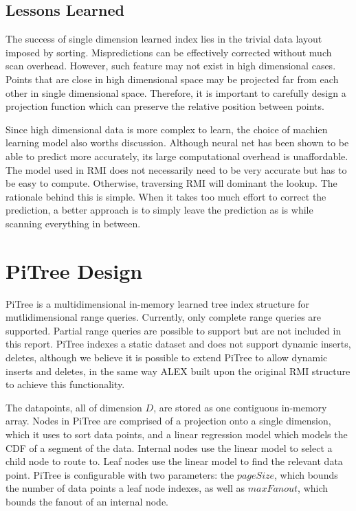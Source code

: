 \documentclass[sigconf,10pt]{acmart}
\begin{document}
\subsection{Lessons Learned}

The success of single dimension learned index lies in the trivial data layout imposed by sorting.
Mispredictions can be effectively corrected without much scan overhead. However, such feature may
not exist in high dimensional cases. Points that are close in high dimensional space may be projected
far from each other in single dimensional space. Therefore, it is important to carefully design a
projection function which can preserve the relative position between points.

Since high dimensional data is more complex to learn, the choice of machien learning model also
worths discussion. Although neural net has been shown to be able to predict more accurately, its
large computational overhead is unaffordable. The model used in RMI does not necessarily need to
be very accurate but has to be easy to compute. Otherwise, traversing RMI will dominant the lookup.
The rationale behind this is simple. When it takes too much effort to correct the prediction, a better
approach is to simply leave the prediction as is while scanning everything in between. 

\section{PiTree Design}

PiTree is a multidimensional in-memory learned tree index structure for
mutlidimensional range queries. Currently, only complete range queries are supported.
Partial range queries are possible to support but are not included in this report. 
PiTree indexes a static dataset and does not support dynamic inserts, deletes,
although we believe it is possible to extend PiTree to allow dynamic inserts and deletes,
in the same way ALEX built upon the original RMI structure to achieve this functionality. %

The datapoints, all of dimension $D$, are stored as one contiguous in-memory array.
Nodes in PiTree are comprised of a projection onto a single dimension, which it uses to
sort data points, and a linear regression model which models the CDF of a segment of the data.
Internal nodes use the linear model to select a child node to route to.
Leaf nodes use the linear model to find the relevant data point. 
PiTree is configurable with two parameters: the $pageSize$, 
which bounds the number of data points
a leaf node indexes, as well as $maxFanout$, which bounds the fanout
of an internal node.
\end{document}
